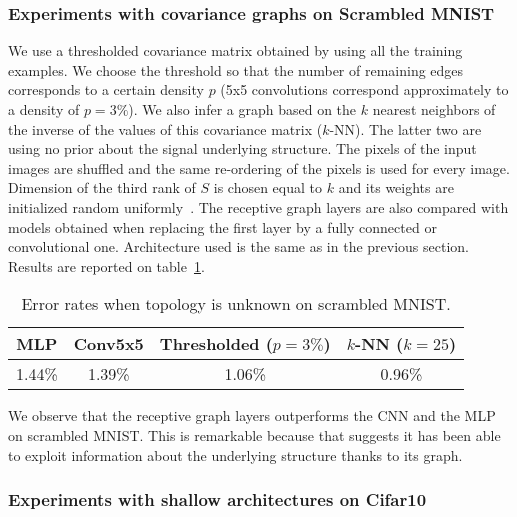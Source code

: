 \subsubsection*{Experiments with covariance graphs on Scrambled MNIST}

 We use a thresholded covariance matrix obtained by using all the training examples. We choose the threshold so that the number of remaining edges corresponds to a certain density $p$ (5x5 convolutions correspond approximately to a density of $p=3\%$). We also infer a graph based on the $k$ nearest neighbors of the inverse of the values of this covariance matrix ($k$-NN). The latter two are using no prior about the signal underlying structure. The pixels of the input images are shuffled and the same re-ordering of the pixels is used for every image. Dimension of the third rank of $S$ is chosen equal to $k$ and its weights are initialized random uniformly~\cite{glorot2010understanding}.
 The receptive graph layers are also compared with models obtained when replacing the first layer by a fully connected or convolutional one. Architecture used is the same as in the previous section. Results are reported on table~\ref{covar}.

\begin{table}[h]
  \caption{Error rates when topology is unknown on scrambled MNIST.}
  \begin{center}
    \bgroup
    \def\arraystretch{1.5}%
    \begin{tabular}{|c|c|c|c|}
      \hline
      MLP & Conv5x5 & Thresholded ($p=3\%$) & $k$-NN ($k=25$)\\
      \hline
      1.44\% & 1.39\% & 1.06\% & 0.96\%\\
      \hline
    \end{tabular}
    \egroup
  \end{center}
  \label{covar}
  \end{table}

We observe that the receptive graph layers outperforms the CNN and the MLP on scrambled MNIST. This is remarkable because that suggests it has been able to exploit information about the underlying structure thanks to its graph.%

\subsubsection*{Experiments with shallow architectures on Cifar10}

